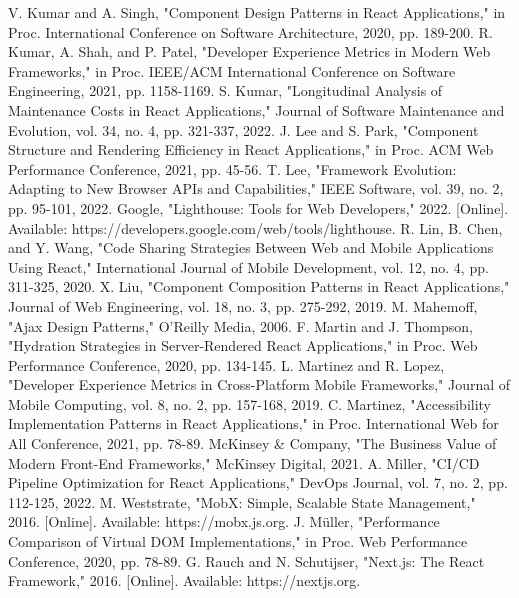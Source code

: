 \begin{thebibliography}{00}
 V. Kumar and A. Singh, "Component Design Patterns in React Applications," in Proc. International Conference on Software Architecture, 2020, pp. 189-200.
 R. Kumar, A. Shah, and P. Patel, "Developer Experience Metrics in Modern Web Frameworks," in Proc. IEEE/ACM International Conference on Software Engineering, 2021, pp. 1158-1169.
 S. Kumar, "Longitudinal Analysis of Maintenance Costs in React Applications," Journal of Software Maintenance and Evolution, vol. 34, no. 4, pp. 321-337, 2022.
 J. Lee and S. Park, "Component Structure and Rendering Efficiency in React Applications," in Proc. ACM Web Performance Conference, 2021, pp. 45-56.
 T. Lee, "Framework Evolution: Adapting to New Browser APIs and Capabilities," IEEE Software, vol. 39, no. 2, pp. 95-101, 2022.
 Google, "Lighthouse: Tools for Web Developers," 2022. [Online]. Available: https://developers.google.com/web/tools/lighthouse.
 R. Lin, B. Chen, and Y. Wang, "Code Sharing Strategies Between Web and Mobile Applications Using React," International Journal of Mobile Development, vol. 12, no. 4, pp. 311-325, 2020.
 X. Liu, "Component Composition Patterns in React Applications," Journal of Web Engineering, vol. 18, no. 3, pp. 275-292, 2019.
 M. Mahemoff, "Ajax Design Patterns," O'Reilly Media, 2006.
 F. Martin and J. Thompson, "Hydration Strategies in Server-Rendered React Applications," in Proc. Web Performance Conference, 2020, pp. 134-145.
 L. Martinez and R. Lopez, "Developer Experience Metrics in Cross-Platform Mobile Frameworks," Journal of Mobile Computing, vol. 8, no. 2, pp. 157-168, 2019.
 C. Martinez, "Accessibility Implementation Patterns in React Applications," in Proc. International Web for All Conference, 2021, pp. 78-89.
 McKinsey & Company, "The Business Value of Modern Front-End Frameworks," McKinsey Digital, 2021.
 A. Miller, "CI/CD Pipeline Optimization for React Applications," DevOps Journal, vol. 7, no. 2, pp. 112-125, 2022.
 M. Weststrate, "MobX: Simple, Scalable State Management," 2016. [Online]. Available: https://mobx.js.org.
 J. Müller, "Performance Comparison of Virtual DOM Implementations," in Proc. Web Performance Conference, 2020, pp. 78-89.
 G. Rauch and N. Schutijser, "Next.js: The React Framework," 2016. [Online]. Available: https://nextjs.org.

\end{thebibliography}

